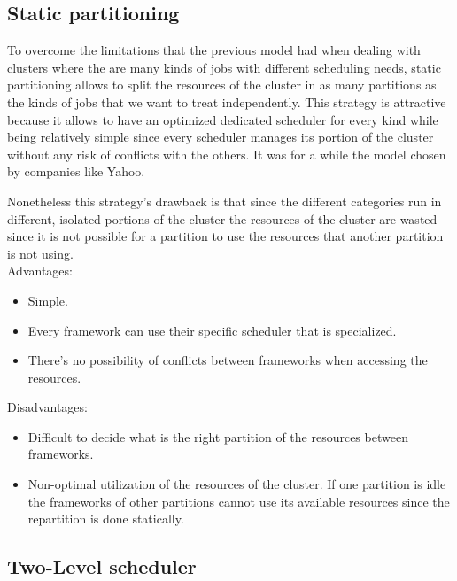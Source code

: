 \documentclass{article}                     %
\begin{document}
\subsection{Static partitioning}

To overcome the limitations that the previous model had when dealing
with clusters where the are many kinds of jobs with different scheduling
needs, static partitioning allows to split the resources of the cluster
in as many partitions as the kinds of jobs that we want to
treat independently. This strategy is attractive because it allows to
have an optimized dedicated scheduler for every kind while being
relatively simple since every scheduler manages its portion of the
cluster without any risk of conflicts with the others. It was
for a while the model chosen by companies like Yahoo.

Nonetheless this strategy's drawback is that since the different 
categories run in different, isolated portions of the cluster the
resources of the cluster are wasted since it is not possible for
a partition to use the resources that another partition is not using. \\

Advantages:

\begin{itemize}\itemsep4pt
    \item Simple.
    \item Every framework can use their specific scheduler that is specialized.
    \item There's no possibility of conflicts between frameworks when
      accessing the resources. \\
\end{itemize}

Disadvantages:

\begin{itemize}\itemsep4pt
  \item Difficult to decide what is the right partition of the resources
between frameworks.
  \item Non-optimal utilization of the resources of the cluster. If
    one partition is idle the frameworks of other partitions cannot
    use its available resources since the repartition is done statically.
\end{itemize}

\subsection{Two-Level scheduler}
\end{document}
